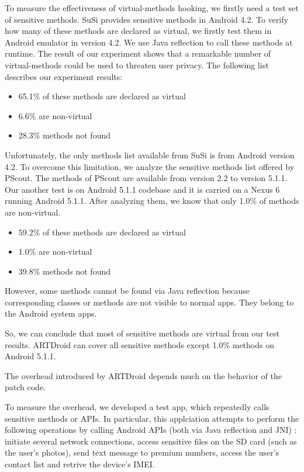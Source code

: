 To measure the effectiveness of virtual-methods hooking, we firstly need a test set of sensitive methods. SuSi\cite{rasthofer2014machine} provides sensitive methods in Android 4.2. To verify how many of these methods are declared as virtual,  we firstly test them in Android emulator in version 4.2. We use Java reflection to call these methods at runtime. The result of our experiment shows that a remarkable number of virtual-methods could be used to threaten user privacy. The following list describes our experiment results: 

\begin{itemize}
\item 65.1\% of these methods are declared as virtual
\item 6.6\% are non-virtual
\item 28.3\% methods not found
\end{itemize}


Unfortunately, the only methods list available from SuSi is from Android version 4.2. To overcome this limitation, we analyze the sensitive methods list offered by PScout\cite{au2012pscout}. The methods of PScout are available from version 2.2 to version 5.1.1. Our another test is on Android 5.1.1 codebase and it is carried on a Nexus 6 running Android 5.1.1. After analyzing them, we know that only 1.0\% of methods are non-virtual. 

\begin{itemize}
\item 59.2\% of these methods are declared as virtual
\item 1.0\% are non-virtual
\item 39.8\% methods not found
\end{itemize}

However, some methods cannot be found via Java reflection because corresponding classes or methods are not visible to normal apps. They belong to the Android system apps.

So, we can conclude that most of sensitive methods are virtual from our test results. ARTDroid can cover all sensitive methods except 1.0\% methods on Android 5.1.1.



The overhead introduced by ARTDroid depends much on the behavior of the patch code. 

To measure the overhead, we developed a test app, which repeatedly calls sensitive methods or APIs. In particular, this applciation attempts to perform the following operations by calling Android APIs (both via Java reflection and JNI) : initiate several network connections, access sensitive files on the SD card (such as the user's photos), send text message to premium numbers, access the user's contact list and retrive the device's IMEI. 

